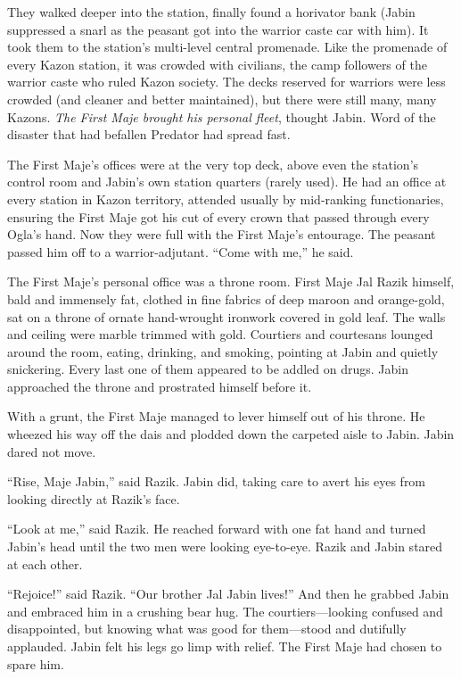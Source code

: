 \documentclass[twoside,letterpaper,12pt]{memoir}
\begin{document}
They walked deeper into the station, finally found a horivator bank (Jabin suppressed a snarl as the peasant got into the warrior caste car with him). It took them to the station's multi-level central promenade. Like the promenade of every Kazon station, it was crowded with civilians, the camp followers of the warrior caste who ruled Kazon society. The decks reserved for warriors were less crowded (and cleaner and better maintained), but there were still many, many Kazons. \textit{The First Maje brought his personal fleet}, thought Jabin. Word of the disaster that had befallen Predator had spread fast.

The First Maje's offices were at the very top deck, above even the station's control room and Jabin's own station quarters (rarely used). He had an office at every station in Kazon territory, attended usually by mid-ranking functionaries, ensuring the First Maje got his cut of every crown that passed through every Ogla's hand. Now they were full with the First Maje's entourage. The peasant passed him off to a warrior-adjutant. ``Come with me,'' he said.

The First Maje's personal office was a throne room. First Maje Jal Razik himself, bald and immensely fat, clothed in fine fabrics of deep maroon and orange-gold, sat on a throne of ornate hand-wrought ironwork covered in gold leaf. The walls and ceiling were marble trimmed with gold. Courtiers and courtesans lounged around the room, eating, drinking, and smoking, pointing at Jabin and quietly snickering. Every last one of them appeared to be addled on drugs. Jabin approached the throne and prostrated himself before it.

With a grunt, the First Maje managed to lever himself out of his throne. He wheezed his way off the dais and plodded down the carpeted aisle to Jabin. Jabin dared not move.

``Rise, Maje Jabin,'' said Razik. Jabin did, taking care to avert his eyes from looking directly at Razik's face.

``Look at me,'' said Razik. He reached forward with one fat hand and turned Jabin's head until the two men were looking eye-to-eye. Razik and Jabin stared at each other.

``Rejoice!'' said Razik. ``Our brother Jal Jabin lives!'' And then he grabbed Jabin and embraced him in a crushing bear hug. The courtiers---looking confused and disappointed, but knowing what was good for them---stood and dutifully applauded. Jabin felt his legs go limp with relief. The First Maje had chosen to spare him.
\end{document}
